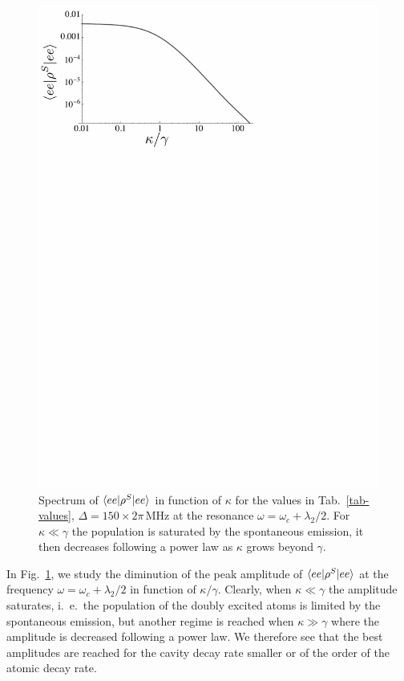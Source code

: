 \begin{figure}
    \center
    \includegraphics[width=0.65 \textwidth]{Images/chap5/kappa.pdf}
    \caption[$\prodsc{ee}{\rho^S}{ee}$ in function of $\kappa$]{ Spectrum of $\prodsc{ee}{\rho^S}{ee}$ in function of $\kappa$ for the values in Tab.~\ref{tab-values}, $\Delta=150 \times 2\pi\,\mbox{MHz}$ at the resonance $\omega=\omega_c+ \lambda_2/2$. For $\kappa\ll \gamma$ the population is saturated by the spontaneous emission, it then decreases following a power law as $\kappa$ grows beyond $\gamma$.}
    \label{fig-kappa}
\end{figure}

In Fig.~\ref{fig-kappa}, we study the diminution of the peak amplitude of $\prodsc{ee}{\rho^S}{ee}$ at the frequency $\omega=\omega_c + \lambda_2/2$ in function of $\kappa/\gamma$. Clearly, when $\kappa \ll \gamma$ the amplitude saturates, i.~e.~the population of the doubly excited atoms is limited by the spontaneous emission, but another regime is reached when $\kappa \gg \gamma$ where the amplitude is decreased following a power law. We therefore see that the best amplitudes are reached for the cavity decay rate smaller or of the order of the atomic decay rate.


